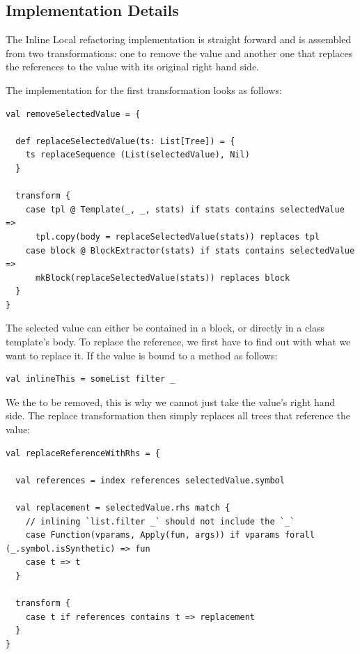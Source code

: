 \documentclass[10pt,a4paper,oneside]{scrreprt}
\begin{document}
\subsection{Implementation Details}

The Inline Local refactoring implementation is straight forward and is assembled from two transformations: one to remove the value and another one that replaces the references to the value with its original right hand side.

The implementation for the first transformation looks as follows:

\begin{lstlisting}
val removeSelectedValue = {
      
  def replaceSelectedValue(ts: List[Tree]) = {
    ts replaceSequence (List(selectedValue), Nil)
  }
  
  transform {
    case tpl @ Template(_, _, stats) if stats contains selectedValue =>
      tpl.copy(body = replaceSelectedValue(stats)) replaces tpl
    case block @ BlockExtractor(stats) if stats contains selectedValue =>
      mkBlock(replaceSelectedValue(stats)) replaces block
  }
}
\end{lstlisting}

The selected value can either be contained in a block, or directly in a class template's body. To replace the reference, we first have to find out with what we want to replace it. If the value is bound to a method as follows:

\begin{lstlisting}
val inlineThis = someList filter _
\end{lstlisting}

We the \src{\_} to be removed, this is why we cannot just take the value's right hand side. The replace transformation then simply replaces all trees that reference the value:

\begin{lstlisting}
val replaceReferenceWithRhs = {
      
  val references = index references selectedValue.symbol
  
  val replacement = selectedValue.rhs match {
    // inlining `list.filter _` should not include the `_`
    case Function(vparams, Apply(fun, args)) if vparams forall (_.symbol.isSynthetic) => fun
    case t => t
  }
  
  transform {
    case t if references contains t => replacement
  }
}
\end{lstlisting}
\end{document}
